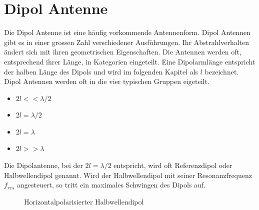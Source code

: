 \section{Dipol Antenne}
Die Dipol Antenne ist eine häufig vorkommende Antennenform. Dipol Antennen gibt es in einer grossen Zahl verschiedener Ausführungen. Ihr Abstrahlverhalten ändert sich mit ihren geometrischen Eigenschaften. Die Antennen werden oft, entsprechend ihrer Länge, in Kategorien eingeteilt. Eine Dipolarmlänge entspricht der halben Länge des Dipols und wird im folgenden Kapitel als $l$ bezeichnet. Dipol Antennen werden oft in die vier typischen Gruppen eigeteilt. 
\begin{itemize}
\item $2l<< \lambda/2 $
\item $2l = \lambda/2 $
\item $2l = \lambda $
\item $2l>> \lambda $
\end{itemize} 
Die Dipolantenne, bei der $2l=\lambda/2$ entspricht, wird oft Referenzdipol oder Halbwellendipol genannt. Wird der Halbwellendipol mit seiner Resonanzfrequenz $f_{res}$ angesteuert, so tritt ein maximales Schwingen des Dipols auf. 

\begin{figure}[!ht]%
	\begin{center}
	\end{center}
\caption{Horizontalpolarisierter Halbwellendipol}
\label{fig:HalbWellenDipolHorizontal}
\end{figure}

